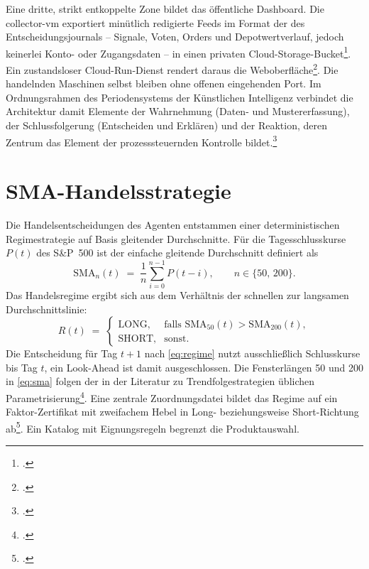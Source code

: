 Eine dritte, strikt entkoppelte Zone bildet das öffentliche Dashboard. Die collector-vm
exportiert minütlich redigierte Feeds im Format der  des Entscheidungsjournals --
Signale, Voten, Orders und Depotwertverlauf, jedoch keinerlei Konto- oder Zugangsdaten -- in
einen privaten Cloud-Storage-Bucket\footcite[vgl.][]{gcpStorage2026}. Ein zustandsloser Cloud-Run-Dienst rendert daraus die
Weboberfläche\footcite[vgl.][]{gcpRun2026}. Die handelnden
Maschinen selbst bleiben ohne offenen eingehenden Port. Im Ordnungsrahmen des
Periodensystems der Künstlichen Intelligenz verbindet die Architektur damit Elemente der
Wahrnehmung (Daten- und Mustererfassung), der Schlussfolgerung (Entscheiden und Erklären)
und der Reaktion, deren Zentrum das Element der prozesssteuernden Kontrolle
bildet.\footcite[vgl.][S.~18]{bitkom2018}

\section{SMA-Handelsstrategie}
\label{sec:umsetzung-strategie}

Die Handelsentscheidungen des Agenten entstammen einer deterministischen
Regimestrategie auf Basis gleitender Durchschnitte. Für die Tagesschlusskurse
$P(t)$ des S\&P~500 ist der einfache gleitende Durchschnitt definiert als
\begin{equation}
  \mathrm{SMA}_n(t) \;=\; \frac{1}{n}\sum_{i=0}^{n-1} P(t-i),
  \qquad n \in \{50,\, 200\}.
  \label{eq:sma}
\end{equation}
Das Handelsregime ergibt sich aus dem Verhältnis der schnellen zur langsamen
Durchschnittslinie:
\begin{equation}
  R(t) \;=\;
  \begin{cases}
    \text{LONG},  & \text{falls } \mathrm{SMA}_{50}(t) > \mathrm{SMA}_{200}(t),\\
    \text{SHORT}, & \text{sonst.}
  \end{cases}
  \label{eq:regime}
\end{equation}
Die Entscheidung für Tag $t{+}1$ nach \cref{eq:regime} nutzt ausschließlich Schlusskurse bis Tag $t$, ein
Look-Ahead ist damit ausgeschlossen. Die Fensterlängen 50 und 200 in \cref{eq:sma} folgen der in der
Literatur zu Trendfolgestrategien üblichen
Parametrisierung\footcites[vgl.][S.~1731--1764]{brock1992}[vgl.][S.~228--250]{moskowitzEtAl2012}.
Eine zentrale Zuordnungsdatei bildet das Regime auf ein Faktor-Zertifikat mit zweifachem
Hebel in Long- beziehungsweise Short-Richtung ab\footcite[vgl.][]{xmarkets2026}. Ein Katalog mit Eignungsregeln begrenzt die Produktauswahl.

